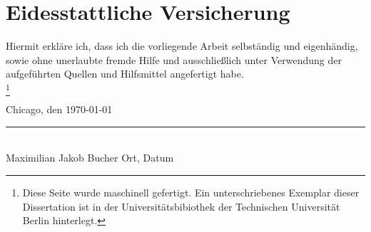 %
\newcommand\blfootnote[1]{%
	\begingroup
	\renewcommand\thefootnote{}\footnote{#1}
	\addtocounter{footnote}{-1}
	\endgroup
	}
%
%
%
%
\chapter[Disclaimer]{Eidesstattliche Versicherung}
Hiermit erkläre ich, dass ich die vorliegende Arbeit selbständig und eigenhändig, sowie ohne unerlaubte fremde Hilfe und ausschließlich unter Verwendung der aufgeführten Quellen und Hilfsmittel angefertigt habe.\\

\blfootnote{Diese Seite wurde maschinell gefertigt. Ein unterschriebenes Exemplar dieser Dissertation ist in der Universit\"atsbibiothek der Technischen Universit\"at Berlin hinterlegt.}
%
\hspace{8cm}Chicago, den \today\\
\hspace{2.5cm}\rule{15cm}{0.4pt}\\
\hspace{2.5cm}Maximilian Jakob Bucher
\hspace{8cm}Ort, Datum\\
%
